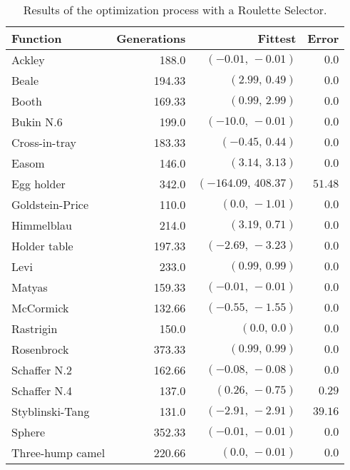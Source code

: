     \begin{table}[H]
      \centering
      \begin{tabular}{|l|r|r|r|}
        \hline
        Function  & Generations & Fittest 
          & Error \\
        \hline\hline
        Ackley	& 188.0	& \((-0.01,\, -0.01)\)	& \(0.0\)\\\hline
        Beale	& 194.33	& \((2.99,\, 0.49)\)	& \(0.0\)\\\hline
        Booth	& 169.33	& \((0.99,\, 2.99)\)	& \(0.0\)\\\hline
        Bukin N.6	& 199.0	& \((-10.0,\, -0.01)\)	& \(0.0\)\\\hline
        Cross-in-tray	& 183.33	& \((-0.45,\, 0.44)\)	& \(0.0\)\\\hline
        Easom	& 146.0	& \((3.14,\, 3.13)\)	& \(0.0\)\\\hline
        Egg holder	& 342.0	& \((-164.09,\, 408.37)\)	& \(51.48\)\\\hline
        Goldstein-Price	& 110.0	& \((0.0,\, -1.01)\)	& \(0.0\)\\\hline
        Himmelblau	& 214.0	& \((3.19,\, 0.71)\)	& \(0.0\)\\\hline
        Holder table	& 197.33	& \((-2.69,\, -3.23)\)	& \(0.0\)\\\hline
        Levi	& 233.0	& \((0.99,\, 0.99)\)	& \(0.0\)\\\hline
        Matyas	& 159.33	& \((-0.01,\, -0.01)\)	& \(0.0\)\\\hline
        McCormick	& 132.66	& \((-0.55,\, -1.55)\)	& \(0.0\)\\\hline
        Rastrigin	& 150.0	& \((0.0,\, 0.0)\)	& \(0.0\)\\\hline
        Rosenbrock	& 373.33	& \((0.99,\, 0.99)\)	& \(0.0\)\\\hline
        Schaffer N.2	& 162.66	& \((-0.08,\, -0.08)\)	& \(0.0\)\\\hline
        Schaffer N.4	& 137.0	& \((0.26,\, -0.75)\)	& \(0.29\)\\\hline
        Styblinski-Tang	& 131.0	& \((-2.91,\, -2.91)\)	& \(39.16\)\\\hline
        Sphere	& 352.33	& \((-0.01,\, -0.01)\)	& \(0.0\)\\\hline
        Three-hump camel	& 220.66	& \((0.0,\, -0.01)\)	& \(0.0\)\\\hline
      \end{tabular}
      \caption{Results of the optimization process with a Roulette Selector.}
      \label{tab:fn_opt:results:roulette}
    \end{table}
